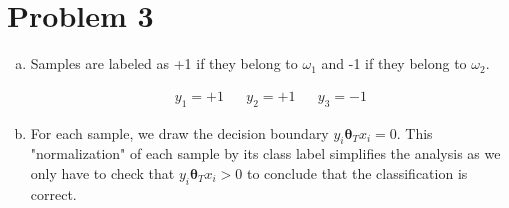 \documentclass[a4paper, 10pt, twoside]{article}
\begin{document}
\section*{Problem 3}

\begin{enumerate}[a)]
    \item Samples are labeled as +1 if they belong to $\omega_1$ and -1 if they belong to $\omega_2$.

          \begin{align*}
              y_1 = +1 &  & y_2 = +1 &  & y_3 = -1
          \end{align*}

    \item For each sample, we draw the decision boundary $y_i \bm{\theta}_T x_i = 0$. This "normalization" of each sample by its class label simplifies the analysis as we only have to check that $y_i \bm{\theta}_T x_i > 0$ to conclude that the classification is correct.


\end{enumerate}
\end{document}
